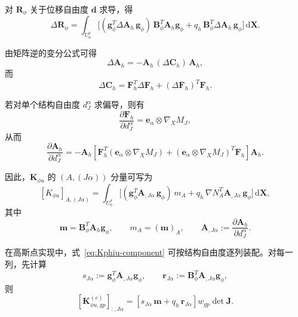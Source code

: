 \documentclass[12pt,a4paper]{ctexart}
\numberwithin{equation}{section}
\newcommand{\bA}{\bm{A}}
\newcommand{\bC}{\bm{C}}
\newcommand{\bF}{\bm{F}}
\newcommand{\bg}{\bm{g}}
\newcommand{\bR}{\bm{R}}
\newcommand{\bB}{\bm{B}}
\newcommand{\bd}{\bm{d}}
\newcommand{\bX}{\bm{X}}
\newcommand{\gradX}{\nabla_{\!X}}
\newcommand{\dd}{\,\mathrm{d}}
\begin{document}
对 $\bR_\phi$ 关于位移自由度 $\bd$ 求导，得
\begin{equation}
\Delta \bR_\phi
=
\int_{U_0^\delta}
\Big[
(\bg_\phi^T\Delta\bA_h\,\bg_\phi)\,\bB_\phi^T\bA_h\bg_\phi
+
q_h\,\bB_\phi^T\Delta\bA_h\,\bg_\phi
\Big]\dd\bX.
\label{eq:dRphi-general}
\end{equation}

由矩阵逆的变分公式可得
\begin{equation}
\Delta\bA_h = -\bA_h\,(\Delta \bC_h)\,\bA_h,
\label{eq:dA-general}
\end{equation}
而
\begin{equation}
\Delta \bC_h = \bF_h^T\Delta \bF_h + (\Delta\bF_h)^T\bF_h.
\label{eq:dC-general}
\end{equation}

若对单个结构自由度 $d_J^\alpha$ 求偏导，则有
\begin{equation}
\frac{\partial \bF_h}{\partial d_J^\alpha}
=
\bm{e}_\alpha\otimes \gradX M_J,
\end{equation}
从而
\begin{equation}
\boxed{
\frac{\partial \bA_h}{\partial d_J^\alpha}
=
-\bA_h
\left[
\bF_h^T(\bm{e}_\alpha\otimes \gradX M_J)
+
(\bm{e}_\alpha\otimes \gradX M_J)^T\bF_h
\right]
\bA_h.
}
\label{eq:A-derivative-column}
\end{equation}

因此，$\bm{K}_{\phi u}$ 的 $(A,(J\alpha))$ 分量可写为
\begin{equation}
\boxed{
[K_{\phi u}]_{A,(J\alpha)}
=
\int_{U_0^\delta}
\Big[
(\bg_\phi^T\bA_{,J\alpha}\,\bg_\phi)\,m_A
+
q_h\,\nabla N_A^T\bA_{,J\alpha}\,\bg_\phi
\Big]\dd\bX,
}
\label{eq:Kphiu-component}
\end{equation}
其中
\begin{equation}
\bm{m}=\bB_\phi^T\bA_h\bg_\phi,
\qquad
m_A=(\bm{m})_A,
\qquad
\bA_{,J\alpha}:=\frac{\partial \bA_h}{\partial d_J^\alpha}.
\end{equation}

在高斯点实现中，式~\eqref{eq:Kphiu-component} 可按结构自由度逐列装配。对每一列，先计算
\begin{equation}
 s_{J\alpha}:=\bg_\phi^T\bA_{,J\alpha}\bg_\phi,
 \qquad
 \bm{r}_{J\alpha}:=\bB_\phi^T\bA_{,J\alpha}\bg_\phi,
\end{equation}
则
\begin{equation}
\boxed{
[\bm{K}_{\phi u,gp}^{(e)}]_{:,J\alpha}
=
\left[
s_{J\alpha}\,\bm{m}
+
q_h\,\bm{r}_{J\alpha}
\right]w_{gp}\det\bm{J}.
}
\label{eq:Kphiu-gp}
\end{equation}
\end{document}

